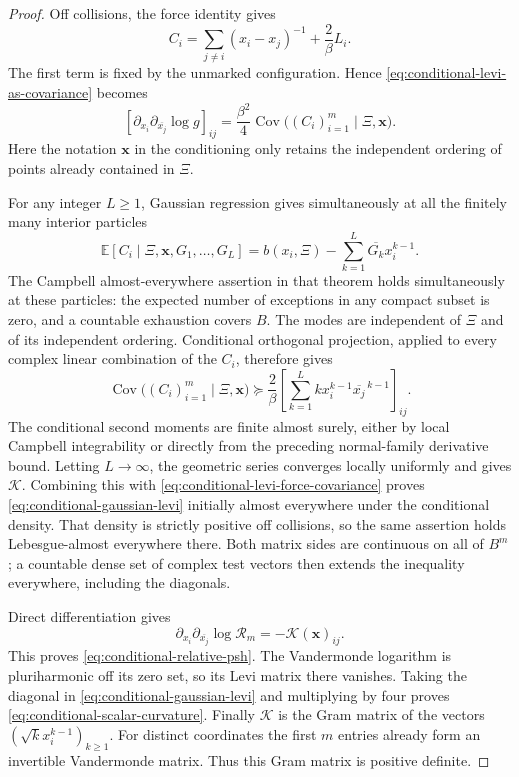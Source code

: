 \documentclass[11pt,a4paper]{article}
\numberwithin{equation}{section}
\theoremstyle{definition}
\theoremstyle{remark}
\begin{document}
\begin{proof}
Off collisions, the force identity gives
\[
 C_i=\sum_{j\ne i}(x_i-x_j)^{-1}+\frac2\beta L_i.
\]
The first term is fixed by the unmarked configuration. Hence
\eqref{eq:conditional-levi-as-covariance} becomes
\begin{equation}\label{eq:conditional-levi-force-covariance}
 \left[\partial_{x_i}\partial_{\overline{x_j}}\log g\right]_{ij}
       =\frac{\beta^2}{4}
          \operatorname{Cov}\bigl((C_i)_{i=1}^m\mid\Xi,\mathbf x\bigr).
\end{equation}
Here the notation $\mathbf x$ in the conditioning only retains the
independent ordering of points already contained in $\Xi$.

For any integer $L\ge1$, Gaussian regression gives simultaneously
at all the finitely many interior particles
\[
 \mathbb E[C_i\mid\Xi,\mathbf x,G_1,\ldots,G_L]
   =b(x_i,\Xi)-\sum_{k=1}^L\overline{G_k}x_i^{k-1}.
\]
The Campbell almost-everywhere assertion in that theorem holds
simultaneously at these particles: the expected number of exceptions
in any compact subset is zero, and a countable exhaustion covers $B$.
The modes are independent of $\Xi$ and of its independent ordering.
Conditional orthogonal projection, applied to every complex linear
combination of the $C_i$, therefore gives
\[
 \operatorname{Cov}\bigl((C_i)_{i=1}^m\mid\Xi,\mathbf x\bigr)
 \succeq \frac2\beta
       \left[\sum_{k=1}^L kx_i^{k-1}\overline{x_j}^{\,k-1}\right]_{ij}.
\]
The conditional second moments are finite almost surely, either by
local Campbell integrability or directly from the preceding
normal-family derivative bound. Letting $L\to\infty$, the geometric
series converges locally uniformly and gives $\mathcal K$. Combining
this with \eqref{eq:conditional-levi-force-covariance} proves
\eqref{eq:conditional-gaussian-levi} initially almost everywhere
under the conditional density. That density is strictly positive
off collisions, so the same assertion holds Lebesgue-almost
everywhere there. Both matrix sides are continuous on all of $B^m$;
a countable dense set of complex test vectors then extends the
inequality everywhere, including the diagonals.

Direct differentiation gives
\[
 \partial_{x_i}\partial_{\overline{x_j}}
                       \log\mathcal R_m=-\mathcal K(\mathbf x)_{ij}.
\]
This proves \eqref{eq:conditional-relative-psh}. The Vandermonde
logarithm is pluriharmonic off its zero set, so its Levi matrix there
vanishes. Taking the diagonal in
\eqref{eq:conditional-gaussian-levi} and multiplying by four proves
\eqref{eq:conditional-scalar-curvature}.
Finally $\mathcal K$ is the Gram matrix of the vectors
$(\sqrt{k}x_i^{k-1})_{k\ge1}$. For distinct coordinates the first
$m$ entries already form an invertible Vandermonde matrix. Thus
this Gram matrix is positive definite.
\end{proof}
\end{document}
